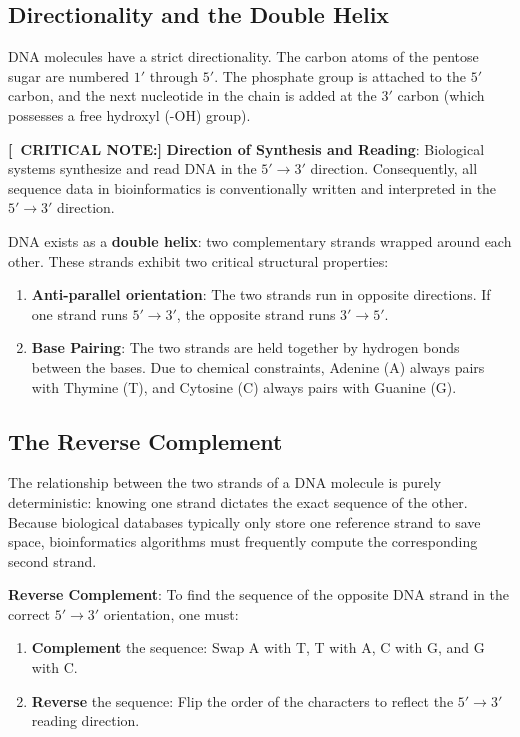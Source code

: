 \documentclass[11pt,a4paper]{article}
\newenvironment{important}{
    \vspace{1em}
    \begin{tcolorbox}[colback=blue!5!white, colframe=blue!75!black, boxrule=1pt, arc=4pt, left=10pt, right=10pt, top=10pt, bottom=10pt]
}{
    \end{tcolorbox}
    \vspace{1em}
}
\newcommand{\sta}{\textbf{[\textasteriskcentered\ CRITICAL NOTE:] }}
\begin{document}
\subsection{Directionality and the Double Helix}
DNA molecules have a strict directionality. The carbon atoms of the pentose sugar are numbered \(1'\) through \(5'\). The phosphate group is attached to the \(5'\) carbon, and the next nucleotide in the chain is added at the \(3'\) carbon (which possesses a free hydroxyl (-OH) group). 

\sta \textbf{Direction of Synthesis and Reading}: Biological systems synthesize and read DNA in the \(5' \to 3'\) direction. Consequently, all sequence data in bioinformatics is conventionally written and interpreted in the \(5' \to 3'\) direction.

DNA exists as a \textbf{double helix}: two complementary strands wrapped around each other. These strands exhibit two critical structural properties:
\begin{enumerate}
    \item \textbf{Anti-parallel orientation}: The two strands run in opposite directions. If one strand runs \(5' \to 3'\), the opposite strand runs \(3' \to 5'\).
    \item \textbf{Base Pairing}: The two strands are held together by hydrogen bonds between the bases. Due to chemical constraints, Adenine (A) always pairs with Thymine (T), and Cytosine (C) always pairs with Guanine (G).
\end{enumerate}

\subsection{The Reverse Complement}
The relationship between the two strands of a DNA molecule is purely deterministic: knowing one strand dictates the exact sequence of the other. Because biological databases typically only store one reference strand to save space, bioinformatics algorithms must frequently compute the corresponding second strand.

\begin{important}
    \textbf{Reverse Complement}: To find the sequence of the opposite DNA strand in the correct \(5' \to 3'\) orientation, one must:
    \begin{enumerate}
        \item \textbf{Complement} the sequence: Swap A with T, T with A, C with G, and G with C.
        \item \textbf{Reverse} the sequence: Flip the order of the characters to reflect the \(5' \to 3'\) reading direction.
    \end{enumerate}
\end{important}
\end{document}

